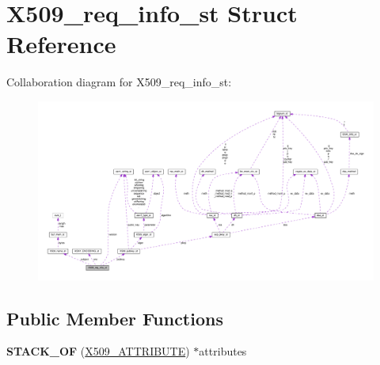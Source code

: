 \hypertarget{structX509__req__info__st}{}\section{X509\+\_\+req\+\_\+info\+\_\+st Struct Reference}
\label{structX509__req__info__st}


Collaboration diagram for X509\+\_\+req\+\_\+info\+\_\+st\+:
\nopagebreak
\begin{figure}[H]
\begin{center}
\leavevmode
\includegraphics[width=350pt]{structX509__req__info__st__coll__graph}
\end{center}
\end{figure}
\subsection*{Public Member Functions}
\begin{DoxyCompactItemize}
\item 
\mbox{\label{structX509__req__info__st_a86e128a024c2c3d5e80a59514c8b3187}} 
{\bfseries S\+T\+A\+C\+K\+\_\+\+OF} (\hyperlink{structx509__attributes__st}{X509\+\_\+\+A\+T\+T\+R\+I\+B\+U\+TE}) $\ast$attributes
\end{DoxyCompactItemize}
